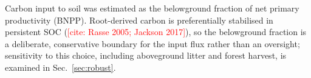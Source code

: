 \documentclass[12pt, a4paper]{article}
\newcommand{\PH}[1]{\textcolor{red}{#1}}
\begin{document}
Carbon input to soil was estimated as the belowground fraction of net
primary productivity (BNPP). Root-derived carbon is preferentially stabilised in
persistent SOC (\PH{[cite: Rasse 2005; Jackson 2017]}), so the belowground
fraction is a deliberate, conservative boundary for the input flux rather than an
oversight; sensitivity to this choice, including aboveground litter and forest
harvest, is examined in Sec.~\ref{sec:robust}.
\end{document}
